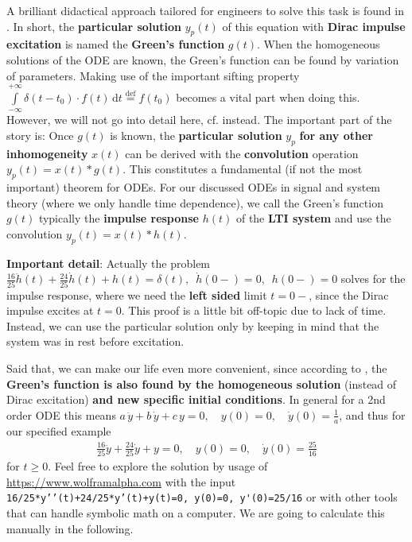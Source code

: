 %
A brilliant didactical approach tailored for engineers to solve this task is
found in \cite{Strang2014}.
%
In short, the \textbf{particular solution} $y_p(t)$ of this equation
with \textbf{Dirac impulse excitation} is named the \textbf{Green's function} $g(t)$.
%
When the homogeneous solutions of the ODE are known, the Green's function can be found
by variation of parameters.
Making use of the important sifting property
$\int\limits_{-\infty}^{+\infty} \delta(t-t_0) \cdot f(t) \, \mathrm{d} t \stackrel{\mathrm{def}}= f(t_0)$
becomes a vital part when doing this.
%
However, we will not go into detail here, cf. \cite[p.133]{Strang2014} instead.
%
The important part of the story is:
Once $g(t)$ is known,
the \textbf{particular solution} $y_p$ \textbf{for any other inhomogeneity}
$x(t)$ can be derived with the \textbf{convolution} operation
$y_p(t) = x(t) * g(t)$.
%
This constitutes a fundamental (if not the most important) theorem for ODEs.
%
For our discussed ODEs in signal and
system theory (where we only handle time dependence), we call the Green's
function $g(t)$ typically the \textbf{impulse response} $h(t)$ of the
\textbf{LTI system} and use the convolution $y_p(t) = x(t) * h(t)$.

\textbf{Important detail}: Actually the problem
$\frac{16}{25} \ddot{h}(t) + \frac{24}{25} \dot{h}(t) + h(t) = \delta(t),\,\,\,
\dot{h}(0-)=0,\,\,\,h(0-)=0$
solves for the impulse response, where we need the \textbf{left sided}
limit $t=0-$, since the Dirac impulse excites at $t=0$.
%
This proof is a little bit off-topic due to lack of time.
%
Instead, we can use the particular solution only by keeping in
mind that the system was in rest before excitation.

Said that, we can make our life even more convenient, since according to
\cite[p.97]{Strang2014},
the \textbf{Green's function is also found by the homogeneous solution}
(instead of Dirac excitation)
\textbf{and new specific initial conditions}.
In general for a 2nd order ODE this means
$a \, \ddot{y} + b \, \dot{y} + c \, y = 0,
\quad y(0)=0,
\quad \dot{y}(0)=\frac{1}{a}$,
and thus for our specified example
\begin{align}
\frac{16}{25} \ddot{y} + \frac{24}{25} \dot{y} + y = 0,
\quad y(0)=0,
\quad \dot{y}(0)=\frac{25}{16}
\end{align}
for $t\geq 0$.
%
Feel free to explore the solution by usage of \url{https://www.wolframalpha.com}
with the input \verb|16/25*y’’(t)+24/25*y’(t)+y(t)=0, y(0)=0, y'(0)=25/16|
or with other tools that can handle symbolic math on a computer.
%
We are going to calculate this manually in the following.
%


